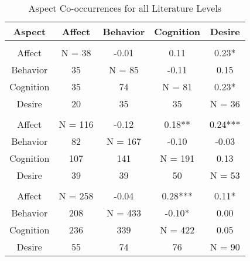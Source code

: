 \begin{table}
\begin{minipage}[t][\textheight][t]{\textwidth}

\caption{\label{tab:CombinedCooccurrences}Aspect Co-occurrences for all Literature Levels}
\begin{tabular}[t]{ccccc}
\toprule
Aspect & Affect & Behavior & Cognition & Desire\\
\midrule
\addlinespace[0.3em]
\multicolumn{5}{l}{\textbf{Theoretical}}\\
\hspace{1em}Affect & N = 38 & -0.01 & 0.11 & 0.23*\\
\hspace{1em}Behavior & 35 & N = 85 & -0.11 & 0.15\\
\hspace{1em}Cognition & 35 & 74 & N = 81 & 0.23*\\
\hspace{1em}Desire & 20 & 35 & 35 & N = 36\\
\addlinespace[0.3em]
\multicolumn{5}{l}{\textbf{Methodological}}\\
\hspace{1em}Affect & N = 116 & -0.12 & 0.18** & 0.24***\\
\hspace{1em}Behavior & 82 & N = 167 & -0.10 & -0.03\\
\hspace{1em}Cognition & 107 & 141 & N = 191 & 0.13\\
\hspace{1em}Desire & 39 & 39 & 50 & N = 53\\
\addlinespace[0.3em]
\multicolumn{5}{l}{\textbf{Empirical}}\\
\hspace{1em}Affect & N = 258 & -0.04 & 0.28*** & 0.11*\\
\hspace{1em}Behavior & 208 & N = 433 & -0.10* & 0.00\\
\hspace{1em}Cognition & 236 & 339 & N = 422 & 0.05\\
\hspace{1em}Desire & 55 & 74 & 76 & N = 90\\
\bottomrule
\end{tabular}
\end{minipage}
\end{table}
